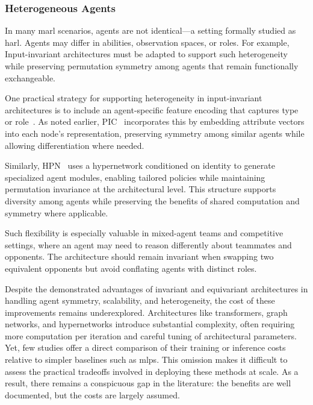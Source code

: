 \documentclass{article}
\begin{document}
\subsubsection{Heterogeneous Agents}
In many \gls{marl} scenarios, agents are not identical—a setting formally studied 
as \gls{harl}. Agents may differ in abilities, observation spaces, or roles. 
For example, Input-invariant architectures must be adapted to support such heterogeneity 
while preserving permutation symmetry among agents that remain functionally exchangeable.

One practical strategy for supporting heterogeneity in input-invariant architectures 
is to include an agent-specific feature encoding that captures type or 
role~\cite{liu2020b,hao2022,hao2023}. As noted earlier, PIC~\cite{liu2020b}
incorporates this by embedding attribute vectors into each node's representation, 
preserving symmetry among similar agents while allowing differentiation where needed.

Similarly, HPN~\cite{hao2023} uses a hypernetwork conditioned on 
identity to generate specialized agent modules, enabling tailored policies 
while maintaining permutation invariance at the architectural level. 
This structure supports diversity among agents while preserving the 
benefits of shared computation and symmetry where applicable.

Such flexibility is especially valuable in mixed-agent teams and 
competitive settings, where an agent may need to reason differently 
about teammates and opponents. The architecture should remain invariant 
when swapping two equivalent opponents but avoid conflating agents 
with distinct roles.

Despite the demonstrated advantages of invariant and equivariant architectures 
in handling agent symmetry, scalability, and heterogeneity, 
the cost of these improvements remains underexplored. 
Architectures like transformers, graph networks, and hypernetworks 
introduce substantial complexity, often requiring more computation 
per iteration and careful tuning of architectural parameters. 
Yet, few studies offer a direct comparison of their training or 
inference costs relative to simpler baselines such as \glspl{mlp}. 
This omission makes it difficult to assess the practical tradeoffs 
involved in deploying these methods at scale. As a result, 
there remains a conspicuous gap in the literature: 
the benefits are well documented, but the costs are largely assumed.
\end{document}
